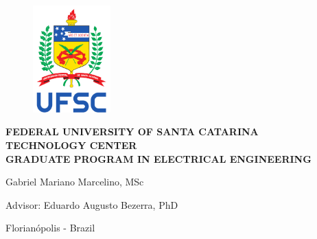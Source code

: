 %
%
%
%
%

%
%
%
%
%

\begin{titlepage}
    \thispagestyle{empty}

    \begin{figure}[!ht]
        \begin{center}
            \includegraphics[width=3cm]{figures/ufsc.pdf}
        \end{center}
    \end{figure}

    \begin{center}
        \large{\textbf{FEDERAL UNIVERSITY OF SANTA CATARINA}} \\
        \large{\textbf{TECHNOLOGY CENTER}} \\
        \large{\textbf{GRADUATE PROGRAM IN ELECTRICAL ENGINEERING}} \\
    \end{center}

    \vfill
    \vfill

    \begin{center}
        \Large{\thetitle}
    \end{center}

    \vfill
    \vfill

    \begin{center}
        \large{Gabriel Mariano Marcelino, MSc}

        Advisor: Eduardo Augusto Bezerra, PhD
    \end{center}

    \vspace{1cm}

    \begin{center}
        Florianópolis - Brazil

        \the\year
    \end{center}
\end{titlepage}
